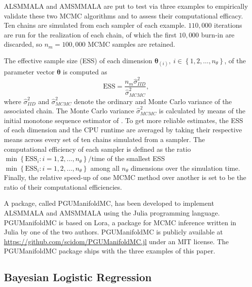 \documentclass[twoside,11pt]{article}
\begin{document}
ALSMMALA and AMSMMALA are put to test via three examples to empirically validate these two MCMC algorithms and to assess 
their computational efficacy. Ten chains are simulated from each sampler of each example. $110,000$ iterations are run for 
the realization of each chain, of which the first $10,000$ burn-in are discarded, so $n_m=100,000$ MCMC samples are retained.

The effective sample size (ESS) of each dimension $\boldsymbol{\theta}_{(i)},~i\in\left\{1,2,\dots,n_{\theta}\right\}$,
of the parameter vector $\boldsymbol{\theta}$ is computed as
\begin{equation}
\mbox{ESS} =
\dfrac{n_m\hat{\sigma}^2_{IID}}{\hat{\sigma}^2_{MCMC}},
\end{equation}
where $\hat{\sigma}^2_{IID}$ and $\hat{\sigma}^2_{MCMC}$ denote the ordinary and Monte Carlo variance of the associated 
chain. The Monte Carlo variance $\hat{\sigma}^2_{MCMC}$ is calculated by means of the initial monotone sequence estimator of
\cite{gey__pra}. To get more reliable estimates, the ESS of each dimension and the CPU runtime are averaged by taking their
respective means across every set of ten chains simulated from a sampler. The computational efficiency of each sampler is
defined as the ratio $\min\left\{\mbox{ESS}_i:i=1,2,\dots,n_{\theta}\right\}/\mbox{time}$ of the smallest ESS
$\min\left\{\mbox{ESS}_i:i=1,2,\dots,n_{\theta}\right\}$ among all $n_{\theta}$ dimensions over the simulation time. Finally,
the relative speed-up of one MCMC method over another is set to be the ratio of their computational efficiencies.

A package, called PGUManifoldMC, has been developed to implement ALSMMALA and AMSMMALA using the Julia programming language.
PGUManifoldMC is based on Lora, a package for MCMC inference written in Julia by one of the two authors. PGUManifoldMC is
publicly available at \url{https://github.com/scidom/PGUManifoldMC.jl} under an MIT license. The PGUManifoldMC package ships
with the three examples of this paper.

\subsection{Bayesian Logistic Regression}
\end{document}
